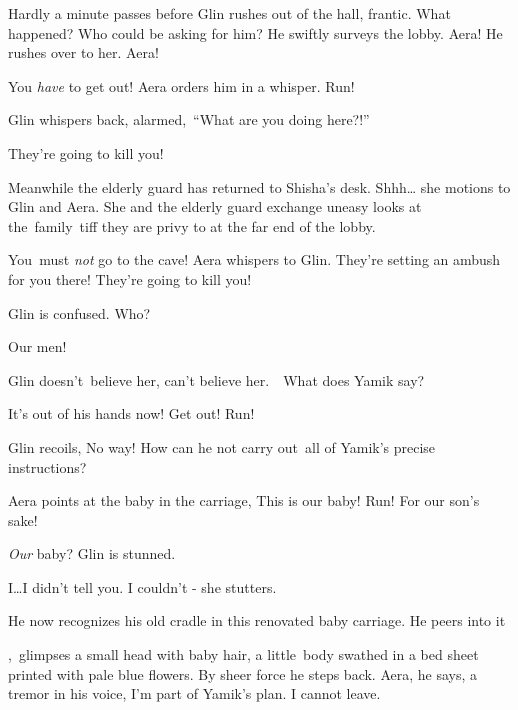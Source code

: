 \documentclass[letterpaper]{article}
\begin{document}
Hardly a minute passes before Glin rushes out of the hall, frantic. What happened? Who could be asking for him? He
swiftly surveys the lobby. Aera! He rushes over to her. {\textquotedbl}Aera!{\textquotedbl} 

{\textquotedbl}You \textit{have} to get out!{\textquotedbl} Aera orders him in a whisper.
{\textquotedbl}Run!{\textquotedbl} 

Glin whispers back, alarmed\textcolor[rgb]{0.0,0.4392157,0.7529412}{,\ }{}``What are you doing here?!'' 

{\textquotedbl}They're going to kill you!{\textquotedbl}

Meanwhile the elderly guard has returned to Shisha's desk. {\textquotedbl}Shhh{\dots}{\textquotedbl} she motions to Glin
and Aera. She and the elderly guard exchange\textcolor[rgb]{0.0,0.4392157,0.7529412}{ u}neasy looks at the~family~tiff
they are privy to at the far end of the lobby.\textbf{\ }

{\textquotedbl}You\textit{\ }must\textit{ not} go to the cave!{\textquotedbl} Aera whispers to Glin.
{\textquotedbl}They're setting an ambush for you there! They're going to kill you!{\textquotedbl} 

Glin is confused. {\textquotedbl}Who?{\textquotedbl}\ \ ~

{\textquotedbl}Our men!{\textquotedbl} 

Glin doesn't\ believe her, can't believe her.\ \ {\textquotedbl}What does Yamik say?{\textquotedbl} 

{\textquotedbl}It's out of his hands now! Get out! Run! {\textquotedbl} 

Glin recoils, {\textquotedbl}No way!{\textquotedbl} How can he not carry out~all of Yamik's precise instructions? 

Aera points at the baby in the carriage, {\textquotedbl}This is our baby! Run! For our son's sake!{\textquotedbl}~ 

{\textquotedbl}\textit{Our }baby?{\textquotedbl} Glin is stunned.

{\textquotedbl}I{\dots}I didn't tell you. I couldn't - {\textquotedbl}she stutters.

He now recognizes his old cradle in this renovated baby carriage. He peers into it

,\textcolor{red}{\ }glimpses a  small head with baby hair, a little\textcolor[rgb]{0.0,0.4392157,0.7529412}{\ }body
swathed in a bed sheet printed with pale blue flowers. By sheer force he steps back.
{\textquotedbl}Aera,{\textquotedbl} he says, a tremor in his voice, {\textquotedbl}I'm part of Yamik's plan. I cannot
leave.{\textquotedbl} 
\end{document}
